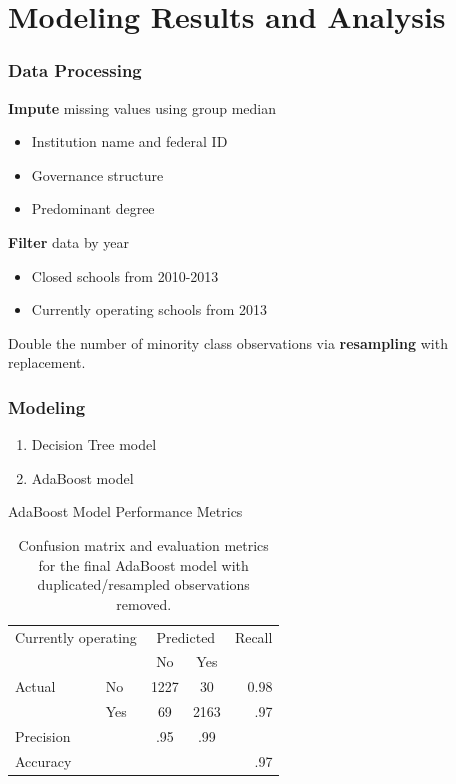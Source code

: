 \documentclass{beamer}
\begin{document}
\section{Modeling Results and Analysis } %
\begin{frame}
\frametitle{Data Processing}

\textbf{Impute} missing values using group median
\begin{itemize}
\item Institution name and federal ID
\item Governance structure  
\item Predominant degree 
\end{itemize}
\textbf{Filter} data by year
\begin{itemize}
\item Closed schools from 2010-2013
\item Currently operating schools from 2013
\end{itemize}

Double the number of minority class observations via \textbf{resampling} with replacement.

\end{frame}
\begin{frame}
\frametitle{Modeling}
\begin{enumerate}
\item Decision Tree model
\item AdaBoost model
\end{enumerate}

\begin{block} {AdaBoost Model Performance Metrics}
\begin{table}[h]
\begin{center}
\begin{tabular}{l l | c c r }
\multicolumn{2}{l}{Currently operating} & \multicolumn{2}{c}{Predicted} & Recall \\
& & No & Yes &  \\ 
\cline{2-5}
Actual & No & 1227 &  30 & 0.98 \\
& Yes & 69 & 2163 & .97 \\  \hline
Precision&  & .95 & .99 \\ 
Accuracy & & &  & .97 \\
	\end{tabular}
	\label{tab:ABConfusionNoDup}
	\caption{Confusion matrix and evaluation metrics for the final AdaBoost model with duplicated/resampled observations removed.}
\end{center}
\end{table}
\end{block}
\end{frame}
\end{document}
